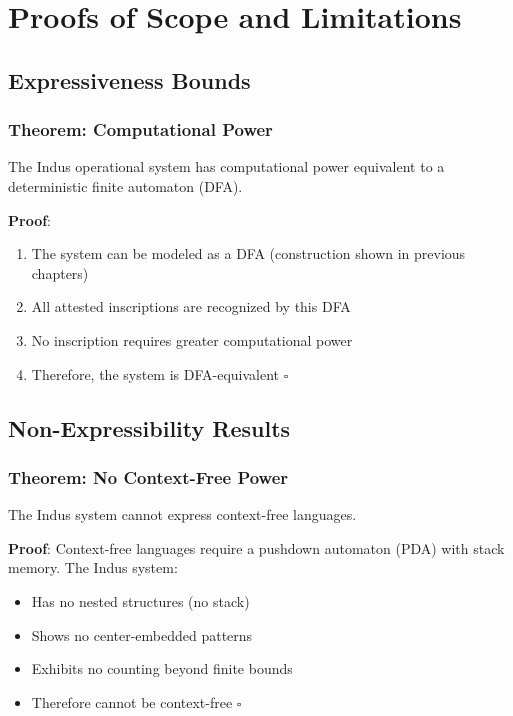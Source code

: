 \section{Proofs of Scope and Limitations}

\subsection{Expressiveness Bounds}

\subsubsection{Theorem: Computational Power}
The Indus operational system has computational power equivalent to a deterministic finite automaton (DFA).

\textbf{Proof}:
\begin{enumerate}
    \item The system can be modeled as a DFA (construction shown in previous chapters)
    \item All attested inscriptions are recognized by this DFA
    \item No inscription requires greater computational power
    \item Therefore, the system is DFA-equivalent $\square$
\end{enumerate}

\subsection{Non-Expressibility Results}

\subsubsection{Theorem: No Context-Free Power}
The Indus system cannot express context-free languages.

\textbf{Proof}: Context-free languages require a pushdown automaton (PDA) with stack memory. The Indus system:
\begin{itemize}
    \item Has no nested structures (no stack)
    \item Shows no center-embedded patterns
    \item Exhibits no counting beyond finite bounds
    \item Therefore cannot be context-free $\square$
\end{itemize}

